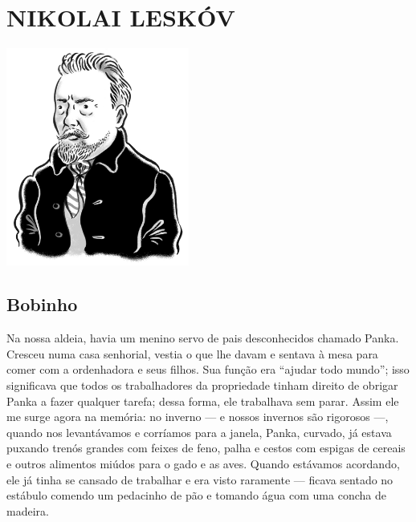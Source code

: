 \part[NIKOLAI LESKÓV]{NIKOLAI LESKÓV }

\pagebreak
\thispagestyle{empty}
\mbox{}
\vfill
\begin{center}
\includegraphics[width=6cm]{./imgs/autor5.jpg}
\end{center}


\chapter{Bobinho} \label{part5}


Na nossa aldeia, havia um menino servo de pais desconhecidos chamado
Panka. Cresceu numa casa senhorial, vestia o que lhe davam e sentava à
mesa para comer com a ordenhadora e seus filhos. Sua função era ``ajudar
todo mundo''; isso significava que todos os trabalhadores da propriedade
tinham direito de obrigar Panka a fazer qualquer tarefa; dessa forma,
ele trabalhava sem parar. Assim ele me surge agora na memória: no
inverno --- e nossos invernos são rigorosos ---, quando nos levantávamos
e corríamos para a janela, Panka, curvado, já estava puxando trenós
grandes com feixes de feno, palha e cestos com espigas de cereais e
outros alimentos miúdos para o gado e as aves. Quando estávamos
acordando, ele já tinha se cansado de trabalhar e era visto raramente
--- ficava sentado no estábulo comendo um pedacinho de pão e tomando
água com uma concha de madeira.

